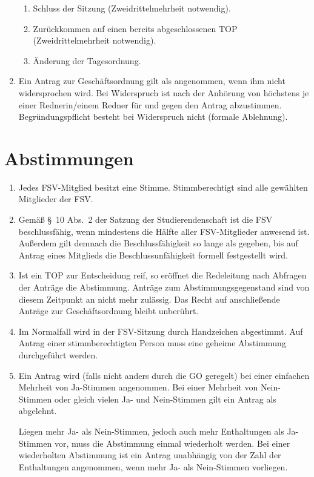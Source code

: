 \begin{enumerate}
\begin{enumerate}
		\item Schluss der Sitzung (Zweidrittelmehrheit notwendig).
		\item Zurückkommen auf einen bereits abgeschlossenen TOP (Zweidrittelmehrheit notwendig).
		\item Änderung der Tagesordnung.
	\end{enumerate}
	\item Ein Antrag zur Geschäftsordnung gilt als angenommen, wenn ihm nicht widersprochen wird.
	Bei Widerspruch ist nach der Anhörung von höchstens je einer Rednerin/einem Redner für und gegen den Antrag abzustimmen.
	Begründungspflicht besteht bei Widerspruch nicht (formale Ablehnung).
\end{enumerate}

\section{Abstimmungen}
\label{sec:abstimmungen}
\begin{enumerate}
	\item Jedes FSV-Mitglied besitzt eine Stimme.
	Stimmberechtigt sind alle gewählten Mitglieder der FSV.
	\item Gemäß §~10 Abs.~2 der Satzung der Studierendenschaft ist die FSV beschlussfähig, wenn mindestens die Hälfte aller FSV-Mitglieder anwesend ist.
	Außerdem gilt demnach die Beschlussfähigkeit so lange als gegeben, bis auf Antrag eines Mitglieds die Beschlussunfähigkeit formell festgestellt wird.
	\item Ist ein TOP zur Entscheidung reif, so eröffnet die Redeleitung nach Abfragen der Anträge die Abstimmung.
	Anträge zum Abstimmungsgegenstand sind von diesem Zeitpunkt an nicht mehr zulässig.
	Das Recht auf anschließende Anträge zur Geschäftsordnung bleibt unberührt.
	\item Im Normalfall wird in der FSV-Sitzung durch Handzeichen abgestimmt.
	Auf Antrag einer stimmberechtigten Person muss eine geheime Abstimmung durchgeführt werden.
	\item Ein Antrag wird (falls nicht anders durch die GO geregelt) bei einer einfachen Mehrheit von Ja-Stimmen angenommen.
	Bei einer Mehrheit von Nein-Stimmen oder gleich vielen Ja- und Nein-Stimmen gilt ein Antrag als abgelehnt.
	
	Liegen mehr Ja- als Nein-Stimmen, jedoch auch mehr Enthaltungen als Ja-Stimmen vor, muss die Abstimmung einmal wiederholt werden.
	Bei einer wiederholten Abstimmung ist ein Antrag unabhängig von der Zahl der Enthaltungen angenommen, wenn mehr Ja- als Nein-Stimmen vorliegen.
\end{enumerate}

